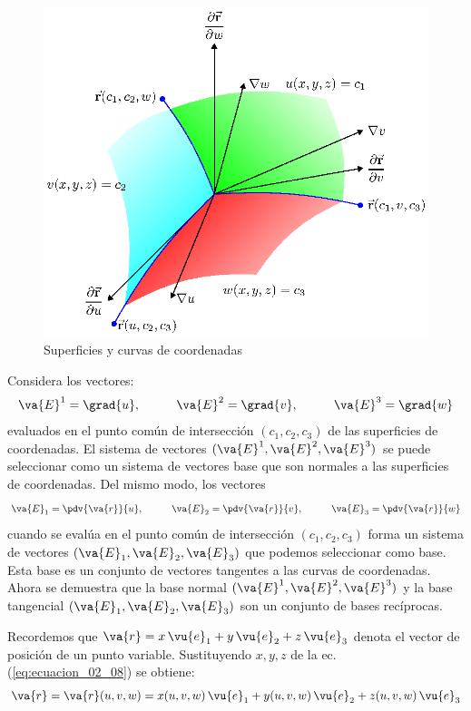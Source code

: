 \begin{figure}[H]
    \centering
    \includegraphics[scale=1.3]{Imagenes/Superficies_Curvas_Coordenadas.eps}
    \caption{Superficies y curvas de coordenadas}
    \label{fig:figura_02_01}
\end{figure}

Considera los vectores:
\begin{align}
\va{E}^{1} = \grad{u}, \hspace{1cm} \va{E}^{2} = \grad{v}, \hspace{1cm} \va{E}^{3} = \grad{w}
\label{eq:ecuacion_02_12}
\end{align}
evaluados en el punto común de intersección $(c_{1}, c_{2}, c_{3})$ de las superficies de coordenadas. El sistema de vectores $(\va{E}^{1}, \va{E}^{2}, \va{E}^{3})$ se puede seleccionar como un sistema de vectores base que son normales a las superficies de coordenadas. Del mismo modo, los vectores
\begin{align}
\va{E}_{1} = \pdv{\va{r}}{u}, \hspace{1cm} \va{E}_{2} = \pdv{\va{r}}{v}, \hspace{1cm} \va{E}_{3} = \pdv{\va{r}}{w}
\label{ec:ecuacion_02_13}
\end{align}
cuando se evalúa en el punto común de intersección $(c_{1}, c_{2}, c_{3})$ forma un sistema de vectores $(\va{E}_{1}, \va{E}_{2}, \va{E}_{3})$ que podemos seleccionar como base. Esta base es un conjunto de vectores tangentes a las curvas de coordenadas. Ahora se demuestra que la base normal $(\va{E}^{1}, \va{E}^{2}, \va{E}^{3})$ y la base tangencial $(\va{E}_{1}, \va{E}_{2}, \va{E}_{3})$ son un conjunto de bases recíprocas.
\par
Recordemos que $\va{r} = x \, \vu{e}_{1} + y \, \vu{e}_{2} + z \, \vu{e}_{3}$ denota el vector de posición de un punto variable. Sustituyendo $x, y, z$ de la ec. (\ref{eq:ecuacion_02_08}) se obtiene:
\begin{align}
\va{r} = \va{r} (u, v, w) = x (u, v, w) \, \vu{e}_{1} + y (u, v, w) \, \vu{e}_{2} + z (u, v, w) \, \vu{e}_{3}
\label{eq:ecuacion_02_14}
\end{align}

